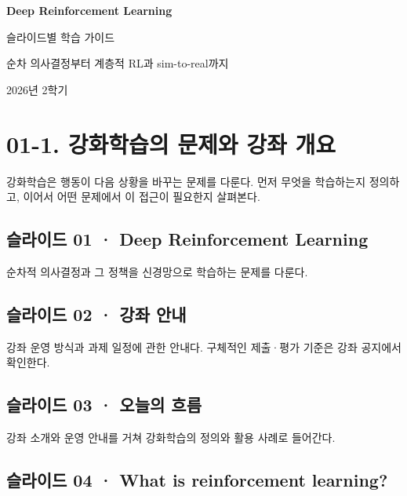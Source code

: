 \documentclass[11pt,a4paper]{article}
\begin{document}
\begin{titlepage}
\centering\vspace*{3cm}
{\Huge\bfseries Deep Reinforcement Learning\par}
\vspace{1.3cm}
{\Large 슬라이드별 학습 가이드\par}
\vspace{0.8cm}
{\large 순차 의사결정부터 계층적 RL과 sim-to-real까지\par}
\vfill
{\large 2026년 2학기\par}
\end{titlepage}
\tableofcontents
\clearpage

\section{01-1. 강화학습의 문제와 강좌 개요}


강화학습은 행동이 다음 상황을 바꾸는 문제를 다룬다. 먼저 무엇을 학습하는지 정의하고, 이어서 어떤 문제에서 이 접근이 필요한지 살펴본다.\par

\subsection{슬라이드 01 · Deep Reinforcement Learning}

순차적 의사결정과 그 정책을 신경망으로 학습하는 문제를 다룬다.\par

\subsection{슬라이드 02 · 강좌 안내}

강좌 운영 방식과 과제 일정에 관한 안내다. 구체적인 제출·평가 기준은 강좌 공지에서 확인한다.\par

\subsection{슬라이드 03 · 오늘의 흐름}

강좌 소개와 운영 안내를 거쳐 강화학습의 정의와 활용 사례로 들어간다.\par

\subsection{슬라이드 04 · What is reinforcement learning?}
\end{document}
